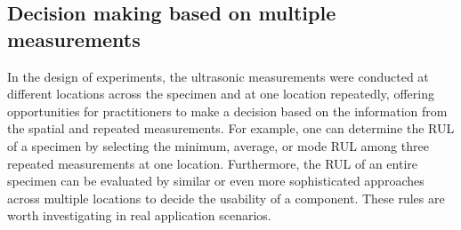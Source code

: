 \subsection{Decision making based on multiple measurements}
In the design of experiments, the ultrasonic measurements were conducted at different locations across the specimen and at one location repeatedly, offering opportunities for practitioners to make a decision based on the information from the spatial and repeated measurements. For example, one can determine the RUL of a specimen by selecting the minimum, average, or mode RUL among three repeated measurements at one location. Furthermore, the RUL of an entire specimen can be evaluated by similar or even more sophisticated approaches across multiple locations to decide the usability of a component. These rules are worth investigating in real application scenarios.
